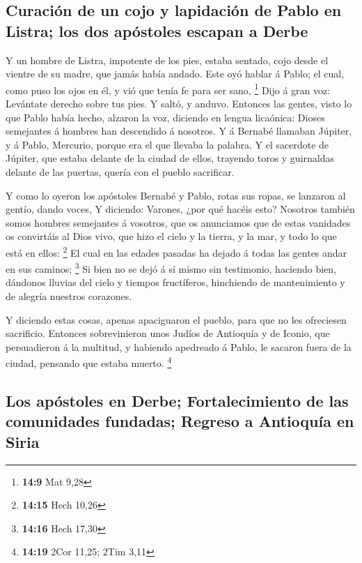 \hypertarget{curaciuxf3n-de-un-cojo-y-lapidaciuxf3n-de-pablo-en-listra-los-dos-apuxf3stoles-escapan-a-derbe}{%
\subsection{Curación de un cojo y lapidación de Pablo en Listra; los dos
apóstoles escapan a
Derbe}\label{curaciuxf3n-de-un-cojo-y-lapidaciuxf3n-de-pablo-en-listra-los-dos-apuxf3stoles-escapan-a-derbe}}

 Y un hombre de Listra, impotente de los pies, estaba
sentado, cojo desde el vientre de su madre, que jamás había andado.
 Este oyó hablar á Pablo; el cual, como puso los ojos en él,
y vió que tenía fe para ser sano, \footnote{\textbf{14:9} Mat 9,28}
 Dijo á gran voz: Levántate derecho sobre tus pies. Y
saltó, y anduvo.  Entonces las gentes, visto lo que Pablo
había hecho, alzaron la voz, diciendo en lengua licaónica: Dioses
semejantes á hombres han descendido á nosotros.  Y á
Bernabé llamaban Júpiter, y á Pablo, Mercurio, porque era el que llevaba
la palabra.  Y el sacerdote de Júpiter, que estaba delante
de la ciudad de ellos, trayendo toros y guirnaldas delante de las
puertas, quería con el pueblo sacrificar.

 Y como lo oyeron los apóstoles Bernabé y Pablo, rotas sus
ropas, se lanzaron al gentío, dando voces,  Y diciendo:
Varones, ¿por qué hacéis esto? Nosotros también somos hombres semejantes
á vosotros, que os anunciamos que de estas vanidades os convirtáis al
Dios vivo, que hizo el cielo y la tierra, y la mar, y todo lo que está
en ellos: \footnote{\textbf{14:15} Hech 10,26}  El cual en
las edades pasadas ha dejado á todas las gentes andar en sus caminos;
\footnote{\textbf{14:16} Hech 17,30}  Si bien no se dejó á
sí mismo sin testimonio, haciendo bien, dándonos lluvias del cielo y
tiempos fructíferos, hinchiendo de mantenimiento y de alegría nuestros
corazones.

 Y diciendo estas cosas, apenas apaciguaron el pueblo, para
que no les ofreciesen sacrificio.  Entonces sobrevinieron
unos Judíos de Antioquía y de Iconio, que persuadieron á la multitud, y
habiendo apedreado á Pablo, le sacaron fuera de la ciudad, pensando que
estaba muerto. \footnote{\textbf{14:19} 2Cor 11,25; 2Tim 3,11}

\hypertarget{los-apuxf3stoles-en-derbe-fortalecimiento-de-las-comunidades-fundadas-regreso-a-antioquuxeda-en-siria}{%
\subsection{Los apóstoles en Derbe; Fortalecimiento de las comunidades
fundadas; Regreso a Antioquía en
Siria}\label{los-apuxf3stoles-en-derbe-fortalecimiento-de-las-comunidades-fundadas-regreso-a-antioquuxeda-en-siria}}

